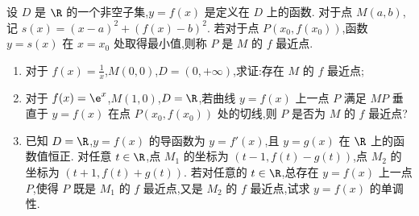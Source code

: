 \begin{problem}
设 \(D\) 是 \(\R\) 的一个非空子集,\(y=f(x)\) 是定义在 \(D\) 上的函数. 对于点 \(M(a,b)\),记 \(s(x)=(x-a)^2+\left( f(x)-b \right)^2\). 若对于点 \(P(x_0,f(x_0))\),函数 \(y=s(x)\) 在 \(x=x_0\) 处取得最小值,则称 \(P\) 是 \(M\) 的 \(f\) 最近点.

\begin{enumerate}
\item 对于 \(f(x)=\frac{1}{x}\),\(M(0,0)\),\(D=(0,+\infty)\),求证:存在 \(M\) 的 \(f\) 最近点;
\item 对于 \(f(x)=\e^x\),\(M(1,0)\),\(D=\R\),若曲线 \(y=f(x)\) 上一点 \(P\) 满足 \(MP\) 垂直于 \(y=f(x)\) 在点 \(P(x_0,f(x_0))\) 处的切线,则 \(P\) 是否为 \(M\) 的 \(f\) 最近点?
\item 已知 \(D=\R\),\(y=f(x)\) 的导函数为 \(y=f'(x)\),且 \(y=g(x)\) 在 \(\R\) 上的函数值恒正. 对任意 \(t\in \R\),点 \(M_1\) 的坐标为 \((t-1,f(t)-g(t))\),点 \(M_2\) 的坐标为 \((t+1,f(t)+g(t))\). 若对任意的 \(t\in \R\),总存在 \(y=f(x)\) 上一点 \(P\),使得 \(P\) 既是 \(M_1\) 的 \(f\) 最近点,又是 \(M_2\) 的 \(f\) 最近点,试求 \(y=f(x)\) 的单调性.
\end{enumerate}
\end{problem}

